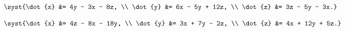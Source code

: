 \begin{multicols}{3}
\begin{enumtasks}
			\item \( \syst{\dot{x} &= 4y - 3x - 8z, \\ \dot{y} &= 6x - 5y + 12z, \\ \dot{z} &= 3z - 5y - 3x.} \) %
			\item \( \syst{\dot{x} &= 4z - 8x - 18y, \\ \dot{y} &= 3x + 7y - 2z, \\ \dot{z} &= 4x + 12y + 5z.} \) %
	
		\end{enumtasks}
	\end{multicols}


